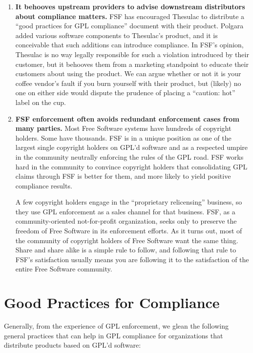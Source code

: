 \documentclass[12pt]{report}
\begin{document}
\begin{enumerate}
\item {\bf It behooves upstream providers to advise downstream
  distributors about compliance matters.}  FSF has encouraged Thesulac to
  distribute a ``good practices for GPL compliance'' document with their
  product.  Polgara added various software components to Thesulac's
  product, and it is conceivable that such additions can introduce
  compliance.  In FSF's opinion, Thesulac is no way legally responsible
  for such a violation introduced by their customer, but it behooves them
  from a marketing standpoint to educate their customers about using the
  product.  We can argue whether or not it is your coffee vendor's fault
  if you burn yourself with their product, but (likely) no one on either
  side would dispute the prudence of placing a ``caution: hot'' label on
  the cup.

\item {\bf FSF enforcement often avoids redundant enforcement cases from
  many parties.}  Most Free Software systems have hundreds of copyright
  holders.  Some have thousands.  FSF is in a unique position as one of
  the largest single copyright holders on GPL'd software and as a
  respected umpire in the community neutrally enforcing the rules of the
  GPL road.  FSF works hard in the community to convince copyright
  holders that consolidating GPL claims through FSF is better for them,
  and more likely to yield positive compliance results.

  A few copyright holders engage in the ``proprietary relicensing''
  business, so they use GPL enforcement as a sales channel for that
  business.  FSF, as a community-oriented not-for-profit organization,
  seeks only to preserve the freedom of Free Software in its enforcement
  efforts.  As it turns out, most of the community of copyright holders
  of Free Software want the same thing.  Share and share alike is a
  simple rule to follow, and following that rule to FSF's satisfaction
  usually means you are following it to the satisfaction of the entire
  Free Software community.

\end{enumerate}

\chapter{Good Practices for Compliance}

Generally, from the experience of GPL enforcement, we glean the following
general practices that can help in GPL compliance for organizations that
distribute products based on GPL'd software:
\end{document}

